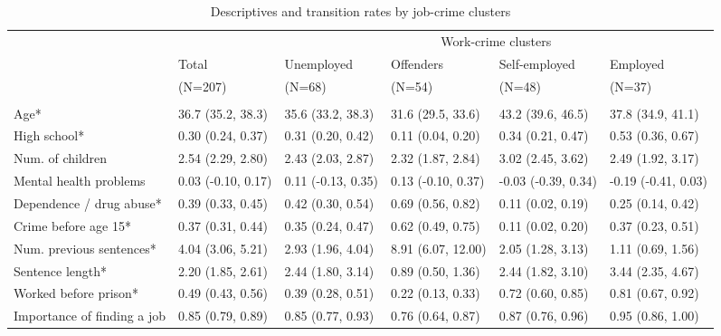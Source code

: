 
\renewcommand{\arraystretch}{0.8}
\begin{scriptsize}
{\setlength{\tabcolsep}{2pt}
\begin{longtable}{llllll} 
\caption{Descriptives and transition rates by job-crime clusters}%
 \label{tab:job_crime_clusters}\\
\hline
\addlinespace
& & \multicolumn{4}{c}{Work-crime clusters} \\
\addlinespace
\cmidrule(lr){3-6} 
\addlinespace
& \multicolumn{1}{l}{Total} & \multicolumn{1}{l}{Unemployed} & \multicolumn{1}{l}{Offenders} & \multicolumn{1}{l}{Self-employed} & \multicolumn{1}{l}{Employed} \\
& \multicolumn{1}{l}{(N=207)} & \multicolumn{1}{l}{(N=68)} & \multicolumn{1}{l}{(N=54)} & \multicolumn{1}{l}{(N=48)} & \multicolumn{1}{l}{(N=37)} \\
\addlinespace[8pt]
\hline
\addlinespace[12pt]
\multicolumn{6}{l}{\textbf{Descriptives}} \\
\addlinespace
\quad Age* & 36.7 (35.2, 38.3) & 35.6 (33.2, 38.3) & 31.6 (29.5, 33.6) & 43.2 (39.6, 46.5) & 37.8 (34.9, 41.1) \\ 
  \quad High school* & 0.30 (0.24, 0.37) & 0.31 (0.20, 0.42) & 0.11 (0.04, 0.20) & 0.34 (0.21, 0.47) & 0.53 (0.36, 0.67) \\ 
  \quad Num. of children & 2.54 (2.29, 2.80) & 2.43 (2.03, 2.87) & 2.32 (1.87, 2.84) & 3.02 (2.45, 3.62) & 2.49 (1.92, 3.17) \\ 
  \quad Mental health problems & 0.03 (-0.10, 0.17) & 0.11 (-0.13, 0.35) & 0.13 (-0.10, 0.37) & -0.03 (-0.39, 0.34) & -0.19 (-0.41, 0.03) \\ 
  \quad Dependence / drug abuse* & 0.39 (0.33, 0.45) & 0.42 (0.30, 0.54) & 0.69 (0.56, 0.82) & 0.11 (0.02, 0.19) & 0.25 (0.14, 0.42) \\ 
  \quad Crime before age 15* & 0.37 (0.31, 0.44) & 0.35 (0.24, 0.47) & 0.62 (0.49, 0.75) & 0.11 (0.02, 0.20) & 0.37 (0.23, 0.51) \\ 
  \quad Num. previous sentences* & 4.04 (3.06, 5.21) & 2.93 (1.96, 4.04) & 8.91 (6.07, 12.00) & 2.05 (1.28, 3.13) & 1.11 (0.69, 1.56) \\ 
  \quad Sentence length* & 2.20 (1.85, 2.61) & 2.44 (1.80, 3.14) & 0.89 (0.50, 1.36) & 2.44 (1.82, 3.10) & 3.44 (2.35, 4.67) \\ 
  \quad Worked before prison* & 0.49 (0.43, 0.56) & 0.39 (0.28, 0.51) & 0.22 (0.13, 0.33) & 0.72 (0.60, 0.85) & 0.81 (0.67, 0.92) \\ 
  \quad Importance of finding a job & 0.85 (0.79, 0.89) & 0.85 (0.77, 0.93) & 0.76 (0.64, 0.87) & 0.87 (0.76, 0.96) & 0.95 (0.86, 1.00) \\ 

\end{longtable}}
\end{scriptsize}
